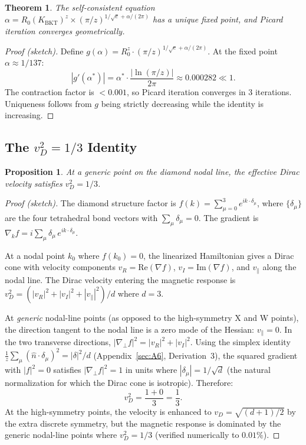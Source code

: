 \documentclass[aps,prd,onecolumn,superscriptaddress,floatfix,12pt]{revtex4-2}
\newcommand{\Rzero}{R_0}
\newcommand{\KBKT}{K_{\text{BKT}}}
\newtheorem{theorem}{Theorem}[section]
\newtheorem{proposition}{Proposition}[section]
\begin{document}
\begin{theorem}
The self-consistent equation $\alpha = \Rzero(\KBKT)^z \times (\pi/z)^{1/\sqrt{e} + \alpha/(2\pi)}$ has a unique fixed point, and Picard iteration converges geometrically.
\end{theorem}

\begin{proof}[Proof (sketch)]
Define $g(\alpha) = \Rzero^z \cdot (\pi/z)^{1/\sqrt{e} + \alpha/(2\pi)}$. At the fixed point $\alpha \approx 1/137$:
\[
|g'(\alpha^*)| = \alpha^* \cdot \frac{|\!\ln(\pi/z)|}{2\pi} \approx 0.000282 \ll 1.
\]
The contraction factor is $< 0.001$, so Picard iteration converges in 3 iterations. Uniqueness follows from $g$ being strictly decreasing while the identity is increasing.
\end{proof}

\subsection{The $v_D^2 = 1/3$ Identity}\label{sec:A-vD}

\begin{proposition}\label{prop:vD}
At a generic point on the diamond nodal line, the effective Dirac velocity satisfies $v_D^2 = 1/3$.
\end{proposition}

\begin{proof}[Proof (sketch)]
The diamond structure factor is $f(k) = \sum_{\mu=0}^{3} e^{ik\cdot\delta_\mu}$, where $\{\delta_\mu\}$ are the four tetrahedral bond vectors with $\sum_\mu \delta_\mu = 0$. The gradient is $\nabla_k f = i\sum_\mu \delta_\mu\, e^{ik\cdot\delta_\mu}$.

At a nodal point $k_0$ where $f(k_0) = 0$, the linearized Hamiltonian gives a Dirac cone with velocity components $v_R = \text{Re}(\nabla f)$, $v_I = \text{Im}(\nabla f)$, and $v_\parallel$ along the nodal line. The Dirac velocity entering the magnetic response is $v_D^2 = (|v_R|^2 + |v_I|^2 + |v_\parallel|^2)/d$ where $d = 3$.

At \emph{generic} nodal-line points (as opposed to the high-symmetry X and W points), the direction tangent to the nodal line is a zero mode of the Hessian: $v_\parallel = 0$. In the two transverse directions, $|\nabla_\perp f|^2 = |v_R|^2 + |v_I|^2$. Using the simplex identity $\frac{1}{z}\sum_\mu (\hat{n}\cdot\delta_\mu)^2 = |\delta|^2/d$ (Appendix~\ref{sec:A6}, Derivation~3), the squared gradient with $|f|^2 = 0$ satisfies $|\nabla_\perp f|^2 = 1$ in units where $|\delta_\mu| = 1/\sqrt{d}$ (the natural normalization for which the Dirac cone is isotropic). Therefore:
\[
v_D^2 = \frac{1 + 0}{3} = \frac{1}{3}.
\]
At the high-symmetry points, the velocity is enhanced to $v_D = \sqrt{(d{+}1)/2}$ by the extra discrete symmetry, but the magnetic response is dominated by the generic nodal-line points where $v_D^2 = 1/3$ (verified numerically to $0.01\%$).
\end{proof}
\end{document}
